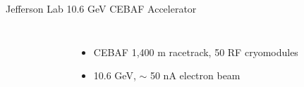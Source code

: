\documentclass[aspectratio=169]{beamer}
\newcommand*{\myfont}{\fontfamily{lmtt}\selectfont}
\begin{document}
\begin{frame}{Jefferson Lab 10.6 GeV CEBAF Accelerator}
\begin{columns}[t, onlytextwidth]
\begin{figure}[t!]
                    
                \end{figure}
                \vspace{-0.45cm}
                  \begin{itemize}
                    \setlength\itemsep{1em}
                    \item CEBAF 1,400 m racetrack, 50 RF cryomodules
                    \item 10.6 GeV, $\sim$ 50 nA electron beam
                    \end{itemize}
            
                \vspace{0.3cm}
                {\myfont{\tiny [V. Burkert et al., NIMA, 959, 163419 (2020)] }}
        \end{columns}
\end{frame}    
\end{document}
